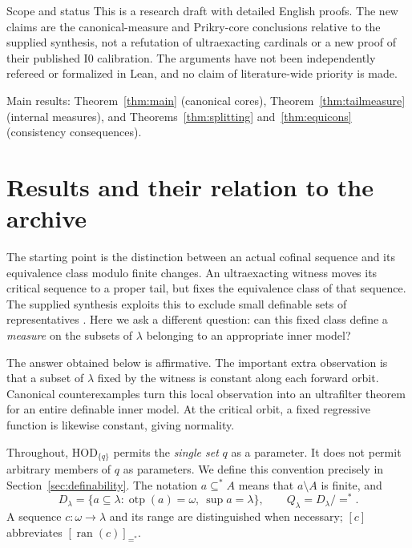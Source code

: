 \documentclass[11pt,letterpaper]{article}
\theoremstyle{definition}
\newcommand{\HOD}{\mathrm{HOD}}
\newcommand{\otp}{\operatorname{otp}}
\newcommand{\ran}{\operatorname{ran}}
\newcommand{\Izero}{\mathrm I0}
\newcommand{\smallnote}[1]{{\small\color{Muted}#1}}
\begin{document}
\begin{titlepage}
\begin{assessment}{Scope and status}
This is a research draft with detailed English proofs. The new claims are the canonical-measure and Prikry-core conclusions relative to the supplied synthesis, not a refutation of ultraexacting cardinals or a new proof of their published $\Izero$ calibration. The arguments have not been independently refereed or formalized in Lean, and no claim of literature-wide priority is made.
\end{assessment}
\vfill
\smallnote{Main results: Theorem~\ref{thm:main} (canonical cores), Theorem~\ref{thm:tailmeasure} (internal measures), and Theorems~\ref{thm:splitting} and~\ref{thm:equicons} (consistency consequences).}
\end{titlepage}

\tableofcontents
\newpage

\section{Results and their relation to the archive}\label{sec:results}

The starting point is the distinction between an actual cofinal sequence and its equivalence class modulo finite changes. An ultraexacting witness moves its critical sequence to a proper tail, but fixes the equivalence class of that sequence. The supplied synthesis exploits this to exclude small definable sets of representatives \cite{archive}. Here we ask a different question: can this fixed class define a \emph{measure} on the subsets of $\lambda$ belonging to an appropriate inner model?

The answer obtained below is affirmative. The important extra observation is that a subset of $\lambda$ fixed by the witness is constant along each forward orbit. Canonical counterexamples turn this local observation into an ultrafilter theorem for an entire definable inner model. At the critical orbit, a fixed regressive function is likewise constant, giving normality.

Throughout, $\HOD_{\{q\}}$ permits the \emph{single set} $q$ as a parameter. It does not permit arbitrary members of $q$ as parameters. We define this convention precisely in Section~\ref{sec:definability}. The notation $a\subseteq^* A$ means that $a\setminus A$ is finite, and
\[
 D_\lambda=\{a\subseteq\lambda:\otp(a)=\omega,\ \sup a=\lambda\},
 \qquad Q_\lambda=D_\lambda/=^*.
\]
A sequence $c:\omega\to\lambda$ and its range are distinguished when necessary; $[c]$ abbreviates $[\ran(c)]_{=^*}$.
\end{document}
